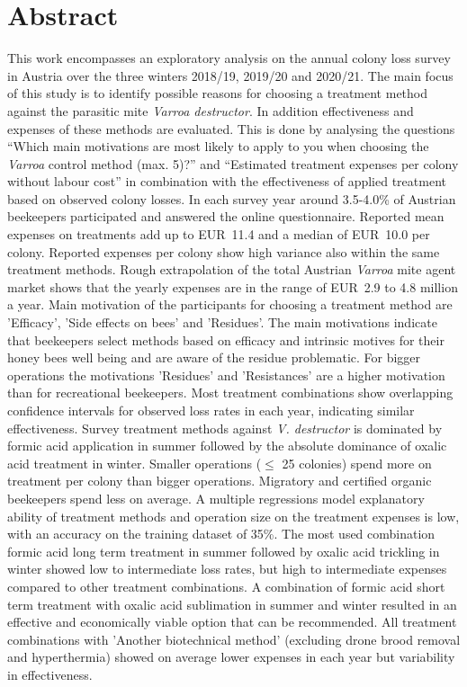 \chapter*{Abstract}
\label{sec:abstract}
\vspace*{-15mm}

This work encompasses an exploratory analysis on the annual colony loss survey in Austria over the three winters 2018/19, 2019/20 and 2020/21. The main focus of this study is to identify possible reasons for choosing a treatment method against the parasitic mite \textit{Varroa destructor}. In addition effectiveness and expenses of these methods are evaluated. This is done by analysing the questions \enquote{Which main motivations are most likely to apply to you when choosing the \textit{Varroa} control method (max. 5)?} and \enquote{Estimated treatment expenses per colony without labour cost} in combination with the effectiveness of applied treatment based on observed colony losses. In each survey year around 3.5-4.0\% of Austrian beekeepers participated and answered the online questionnaire. Reported mean expenses on treatments add up to EUR~11.4 and a median of EUR~10.0 per colony. Reported expenses per colony show high variance also within the same treatment methods. Rough extrapolation of the total Austrian \textit{Varroa} mite agent market shows that the yearly expenses are in the range of EUR~2.9 to 4.8 million a year. Main motivation of the participants for choosing a treatment method are 'Efficacy', 'Side effects on bees' and 'Residues'. The main motivations indicate that beekeepers select methods based on efficacy and intrinsic motives for their honey bees well being and are aware of the residue problematic. For bigger operations the motivations 'Residues' and 'Resistances' are a higher motivation than for recreational beekeepers. Most treatment combinations show overlapping confidence intervals for observed loss rates in each year, indicating similar effectiveness. Survey treatment methods against \textit{V. destructor} is dominated by formic acid application in summer followed by the absolute dominance of oxalic acid treatment in winter. Smaller operations ($\leq$ 25 colonies) spend more on treatment per colony than bigger operations. Migratory and certified organic beekeepers spend less on average. A multiple regressions model explanatory ability of treatment methods and operation size on the treatment expenses is low, with an accuracy on the training dataset of 35\%. The most used combination formic acid long term treatment in summer followed by oxalic acid trickling in winter showed low to intermediate loss rates, but high to intermediate expenses compared to other treatment combinations. A combination of formic acid short term treatment with oxalic acid sublimation in summer and winter resulted in an effective and economically viable option that can be recommended. All treatment combinations with 'Another biotechnical method' (excluding drone brood removal and hyperthermia) showed on average lower expenses in each year but variability in effectiveness.
